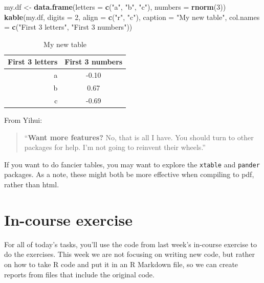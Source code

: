 \documentclass[]{book}
\makeatletter
\newenvironment{Shaded}{\begin{snugshade}}{\end{snugshade}}
\newcommand{\KeywordTok}[1]{\textcolor[rgb]{0.13,0.29,0.53}{\textbf{{#1}}}}
\newcommand{\DataTypeTok}[1]{\textcolor[rgb]{0.13,0.29,0.53}{{#1}}}
\newcommand{\DecValTok}[1]{\textcolor[rgb]{0.00,0.00,0.81}{{#1}}}
\newcommand{\StringTok}[1]{\textcolor[rgb]{0.31,0.60,0.02}{{#1}}}
\newcommand{\NormalTok}[1]{{#1}}
\newenvironment{kframe}{%
\medskip{}
\setlength{\fboxsep}{.8em}
 \def\at@end@of@kframe{}%
 \ifinner\ifhmode%
  \def\at@end@of@kframe{\end{minipage}}%
  \begin{minipage}{\columnwidth}%
 \fi\fi%
 \def\FrameCommand##1{\hskip\@totalleftmargin \hskip-\fboxsep
 \colorbox{shadecolor}{##1}\hskip-\fboxsep
     \hskip-\linewidth \hskip-\@totalleftmargin \hskip\columnwidth}%
 \MakeFramed {\advance\hsize-\width
   \@totalleftmargin\z@ \linewidth\hsize
   \@setminipage}}%
 {\par\unskip\endMakeFramed%
 \at@end@of@kframe}
\renewenvironment{Shaded}{\begin{kframe}}{\end{kframe}}
\makeatother
\begin{document}
\begin{Shaded}
\begin{Highlighting}[]
\NormalTok{my.df <-}\StringTok{ }\KeywordTok{data.frame}\NormalTok{(}\DataTypeTok{letters =} \KeywordTok{c}\NormalTok{(}\StringTok{"a"}\NormalTok{, }\StringTok{"b"}\NormalTok{, }\StringTok{"c"}\NormalTok{),}
                \DataTypeTok{numbers =} \KeywordTok{rnorm}\NormalTok{(}\DecValTok{3}\NormalTok{))}
\KeywordTok{kable}\NormalTok{(my.df, }\DataTypeTok{digits =} \DecValTok{2}\NormalTok{, }\DataTypeTok{align =} \KeywordTok{c}\NormalTok{(}\StringTok{"r"}\NormalTok{, }\StringTok{"c"}\NormalTok{),}
      \DataTypeTok{caption =} \StringTok{"My new table"}\NormalTok{, }
      \DataTypeTok{col.names =} \KeywordTok{c}\NormalTok{(}\StringTok{"First 3 letters"}\NormalTok{, }
                    \StringTok{"First 3 numbers"}\NormalTok{))}
\end{Highlighting}
\end{Shaded}

\begin{table}

\caption{\label{tab:unnamed-chunk-294}My new table}
\centering
\begin{tabular}[t]{r|c}
\hline
First 3 letters & First 3 numbers\\
\hline
a & -0.10\\
\hline
b & 0.67\\
\hline
c & -0.69\\
\hline
\end{tabular}
\end{table}

From Yihui:

\begin{quote}
``\textbf{Want more features?} No, that is all I have. You should turn
to other packages for help. I'm not going to reinvent their wheels.''
\end{quote}

If you want to do fancier tables, you may want to explore the
\texttt{xtable} and \texttt{pander} packages. As a note, these might
both be more effective when compiling to pdf, rather than html.

\section{In-course exercise}\label{in-course-exercise-4}

For all of today's tasks, you'll use the code from last week's in-course
exercise to do the exercises. This week we are not focusing on writing
new code, but rather on how to take R code and put it in an R Markdown
file, so we can create reports from files that include the original
code.
\end{document}
